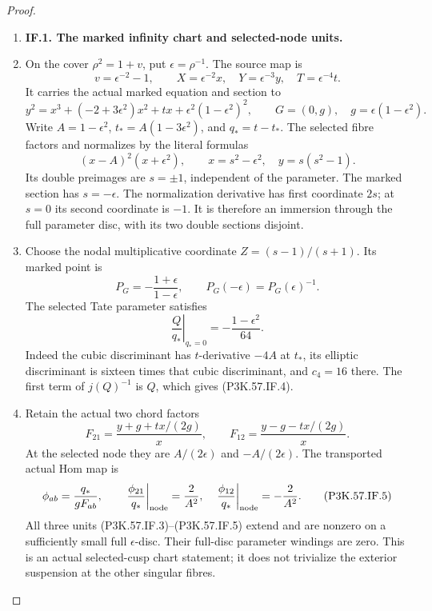 \begin{proof}
\begin{enumerate}[label=\arabic*.]
\item \par\medskip\noindent\textbf{IF.1. The marked infinity chart and selected-node units.}\par\nopagebreak[4]

\item On the cover \(\rho^2=1+v\), put \(\epsilon=\rho^{-1}\). The source map is
\[
 v=\epsilon^{-2}-1,\qquad
 X=\epsilon^{-2}x,\quad Y=\epsilon^{-3}y,\quad T=\epsilon^{-4}t.
\]
It carries the actual marked equation and section to
\[
 y^2=x^3+(-2+3\epsilon^2)x^2+t x
                     +\epsilon^2(1-\epsilon^2)^2,\qquad
 G=(0,g),\quad g=\epsilon(1-\epsilon^2).                 \tag{P3K.57.IF.1}
\]
Write \(A=1-\epsilon^2\), \(t_*=A(1-3\epsilon^2)\), and \(q_*=t-t_*\).
The selected fibre factors and normalizes by the literal formulas
\[
 (x-A)^2(x+\epsilon^2),\qquad
 x=s^2-\epsilon^2,\quad y=s(s^2-1).                     \tag{P3K.57.IF.2}
\]
Its double preimages are \(s=\pm1\), independent of the parameter. The marked
section has \(s=-\epsilon\). The normalization derivative has first coordinate
\(2s\); at \(s=0\) its second coordinate is \(-1\). It is therefore an immersion
through the full parameter disc, with its two double sections disjoint.

\item Choose the nodal multiplicative coordinate \(Z=(s-1)/(s+1)\). Its marked point
is
\[
 P_G=-\frac{1+\epsilon}{1-\epsilon},\qquad
 P_G(-\epsilon)=P_G(\epsilon)^{-1}.                    \tag{P3K.57.IF.3}
\]
The selected Tate parameter satisfies
\[
 \left.\frac{Q}{q_*}\right|_{q_*=0}
       =-\frac{1-\epsilon^2}{64}.                       \tag{P3K.57.IF.4}
\]
Indeed the cubic discriminant has \(t\)-derivative \(-4A\) at \(t_*\), its
elliptic discriminant is sixteen times that cubic discriminant, and \(c_4=16\)
there. The first term of \(j(Q)^{-1}\) is \(Q\), which gives (P3K.57.IF.4).

\item Retain the actual two chord factors
\[
 F_{21}=\frac{y+g+t x/(2g)}x,\qquad
 F_{12}=\frac{y-g-t x/(2g)}x .
\]
At the selected node they are \(A/(2\epsilon)\) and
\(-A/(2\epsilon)\). The transported actual Hom map is
\[
 \phi_{ab}=\frac{q_*}{g F_{ab}},\qquad
 \left.\frac{\phi_{21}}{q_*}\right|_{\rm node}=\frac2{A^2},
 \quad
 \left.\frac{\phi_{12}}{q_*}\right|_{\rm node}=-\frac2{A^2}.       \tag{P3K.57.IF.5}
\]
All three units (P3K.57.IF.3)--\allowbreak (P3K.57.IF.5) extend and are nonzero on a sufficiently small
full \(\epsilon\)-disc. Their full-disc parameter windings are zero. This is
an actual selected-cusp chart statement; it does not trivialize the exterior
suspension at the other singular fibres.


\end{enumerate}
\end{proof}
